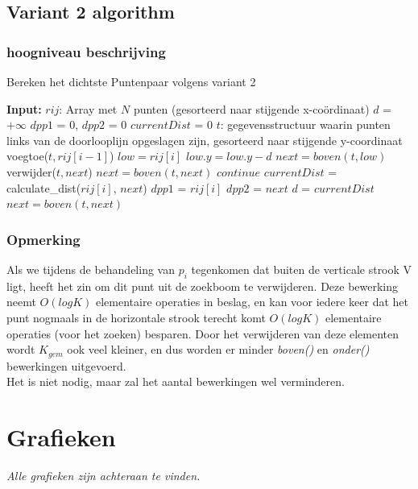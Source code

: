 \documentclass[12pt]{article}
\begin{document}
\newpage
\subsection{Variant 2 algorithm}
\subsubsection{hoogniveau beschrijving}

\begin{algorithm}
\caption{Bereken het dichtste Puntenpaar volgens variant 2}
\begin{algorithmic}
	\STATE \textbf{Input:}  $rij$: Array met $N$ punten (gesorteerd naar stijgende x-co\"ordinaat)
	\STATE $d$ = $+\infty$
	\STATE $dpp1$ = 0, $dpp2$ = 0
	\STATE $currentDist$ = 0
	\STATE $t$: gegevensstructuur waarin punten links van de doorlooplijn opgeslagen zijn, gesorteerd naar stijgende y-coordinaat
    \STATE voegtoe($t, rij[i-1]$)
    \STATE $low = rij[i]$
    \STATE $low.y = low.y - d$
    \STATE $next = boven(t,low)$
        \STATE verwijder($t, next$)
        \STATE $next = boven(t,next)$
        \STATE $continue$
      \ENDIF
      \STATE $currentDist$ = calculate\_dist($rij[i]$, $next$)
  			\STATE $dpp1$ = $rij[i]$
  			\STATE $dpp2$ = $next$
  			\STATE $d$ = $currentDist$
  		\ENDIF
      \STATE $next = boven(t,next)$
    \ENDWHILE
  \ENDFOR
\end{algorithmic}
\end{algorithm}

\subsubsection{Opmerking}
Als we tijdens de behandeling van $p_i$ tegenkomen dat buiten de verticale
strook V ligt, heeft het zin om dit punt uit de zoekboom te verwijderen. Deze bewerking neemt
$O(logK)$ elementaire operaties in beslag, en kan voor iedere keer dat het punt nogmaals in de horizontale strook terecht komt $O(logK)$ elementaire operaties (voor het zoeken) besparen. Door het verwijderen van deze elementen wordt $K_{gem}$ ook veel kleiner, en dus worden er minder \textit{boven()} en \textit{onder()} bewerkingen uitgevoerd. \\
Het is niet nodig, maar zal het aantal bewerkingen wel verminderen.

\section{Grafieken}
\textit{Alle grafieken zijn achteraan te vinden.}
\end{document}
